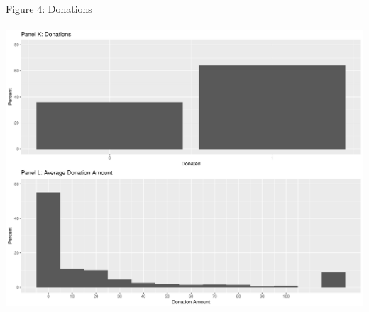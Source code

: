 \documentclass[12pt]{article}
\begin{document}
\noindent Figure 4: Donations\\ \\
\includegraphics[scale=0.35]{Figure4.pdf}\\

\newpage
\end{document}

